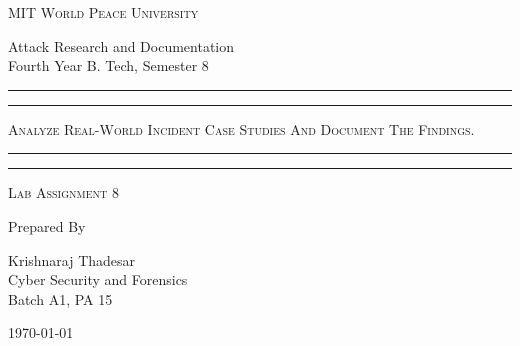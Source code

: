 \documentclass[11pt]{article}
\begin{document}
\begin{titlepage}
	\centering


	\huge\textsc{
		MIT World Peace University
	}\\

	\vspace{0.75\baselineskip} %

	\LARGE{
		Attack Research and Documentation\\
		Fourth Year B. Tech, Semester 8
	}

	\vfill %


	\rule{\textwidth}{1.6pt}\vspace*{-\baselineskip}\vspace*{2pt}
	\rule{\textwidth}{0.6pt}
	\vspace{0.75\baselineskip} %

	\huge{\textsc{
		Analyze Real-World Incident Case Studies And Document The Findings.
    }} \\

	\vspace{0.5\baselineskip} %
	\rule{\textwidth}{0.6pt}\vspace*{-\baselineskip}\vspace*{2.8pt}
	\rule{\textwidth}{1.6pt}

	\vspace{1\baselineskip} %


	\LARGE\textsc{
		Lab Assignment 8
	} %
	\vfill


	Prepared By \vspace{0.5\baselineskip} %

	\Large{
		Krishnaraj Thadesar \\
		Cyber Security and Forensics\\
        Batch A1, PA 15
	}

	\vspace{0.5\baselineskip} %
	\today

\end{titlepage}
\end{document}
